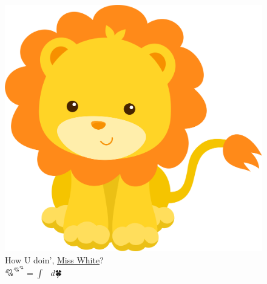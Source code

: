 \documentclass[a4paper,english]{article}
\begin{document}
	\thispagestyle{empty}
	\begin{figure}
		\centering
		\includegraphics[width=1.0\linewidth]{img/lion.png}
		\caption*{How U doin', \href{http://how-u-doing.github.io/}{Miss 
		White}?
			\\ $💘^{💘^{💘}} = ∫_{🐣}^{👵}  🐳\ d🍀$ }
		\label{cover:lion}
	\end{figure}
	\pagecolor{pink}
	\afterpage{\nopagecolor}
	\clearpage
	\newpage
	
\end{document}
